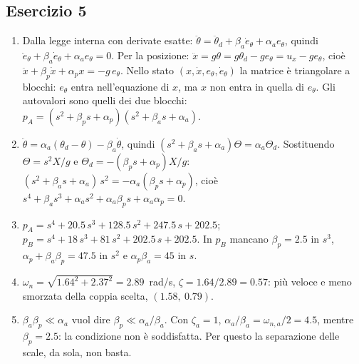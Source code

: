 \documentclass[11pt,a4paper]{article}
\begin{document}
\subsection*{Esercizio 5}
\begin{enumerate}[label=(\alph*)]
  \item Dalla legge interna con derivate esatte: $\ddot\theta = \ddot\theta_d + \beta_a\dot e_\theta + \alpha_a e_\theta$, quindi $\ddot e_\theta + \beta_a\dot e_\theta + \alpha_a e_\theta = 0$. Per la posizione: $\ddot x = g\theta = g\theta_d - g e_\theta = u_x - g e_\theta$, cioè $\ddot x + \beta_p\dot x + \alpha_p x = -g\,e_\theta$. Nello stato $(x, \dot x, e_\theta, \dot e_\theta)$ la matrice è triangolare a blocchi: $e_\theta$ entra nell'equazione di $x$, ma $x$ non entra in quella di $e_\theta$. Gli autovalori sono quelli dei due blocchi: $p_A = (s^2 + \beta_p s + \alpha_p)(s^2 + \beta_a s + \alpha_a)$.
  \item $\ddot\theta = \alpha_a(\theta_d - \theta) - \beta_a\dot\theta$, quindi $(s^2 + \beta_a s + \alpha_a)\Theta = \alpha_a\Theta_d$. Sostituendo $\Theta = s^2X/g$ e $\Theta_d = -(\beta_p s + \alpha_p)X/g$: $(s^2 + \beta_a s + \alpha_a)\,s^2 = -\alpha_a(\beta_p s + \alpha_p)$, cioè $s^4 + \beta_a s^3 + \alpha_a s^2 + \alpha_a\beta_p s + \alpha_a\alpha_p = 0$.
  \item $p_A = s^4 + 20.5\,s^3 + 128.5\,s^2 + 247.5\,s + 202.5$; $p_B = s^4 + 18\,s^3 + 81\,s^2 + 202.5\,s + 202.5$. In $p_B$ mancano $\beta_p = 2.5$ in $s^3$, $\alpha_p + \beta_a\beta_p = 47.5$ in $s^2$ e $\alpha_p\beta_a = 45$ in $s$.
  \item $\omega_n = \sqrt{1.64^2 + 2.37^2} = 2.89$~rad/s, $\zeta = 1.64/2.89 = 0.57$: più veloce e meno smorzata della coppia scelta, $(1.58,\ 0.79)$.
  \item $\beta_a\beta_p \ll \alpha_a$ vuol dire $\beta_p \ll \alpha_a/\beta_a$. Con $\zeta_a = 1$, $\alpha_a/\beta_a = \omega_{n,a}/2 = 4.5$, mentre $\beta_p = 2.5$: la condizione non è soddisfatta. Per questo la separazione delle scale, da sola, non basta.
\end{enumerate}
\end{document}

